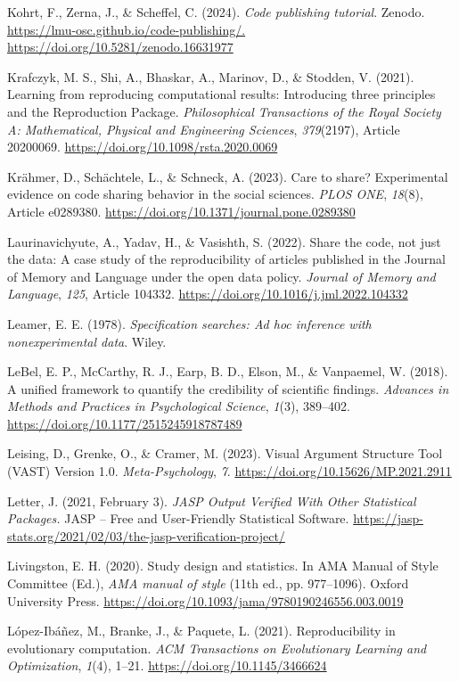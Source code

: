 \documentclass[authordate, meta]{jote-new-article}
\begin{document}
	Kohrt, F., Zerna, J., \& Scheffel, C. (2024). \emph{Code publishing tutorial}. Zenodo. \url{https://lmu-osc.github.io/code-publishing/.} \url{https://doi.org/10.5281/zenodo.16631977}


	Krafczyk, M. S., Shi, A., Bhaskar, A., Marinov, D., \& Stodden, V. (2021). Learning from reproducing computational results: Introducing three principles and the Reproduction Package. \emph{Philosophical Transactions of the Royal Society A: Mathematical, Physical and Engineering Sciences}, \emph{379}(2197), Article 20200069. \url{https://doi.org/10.1098/rsta.2020.0069}


	Krähmer, D., Schächtele, L., \& Schneck, A. (2023). Care to share? Experimental evidence on code sharing behavior in the social sciences. \emph{PLOS ONE}, \emph{18}(8), Article e0289380. \url{https://doi.org/10.1371/journal.pone.0289380}


	Laurinavichyute, A., Yadav, H., \& Vasishth, S. (2022). Share the code, not just the data: A case study of the reproducibility of articles published in the Journal of Memory and Language under the open data policy. \emph{Journal of Memory and Language}, \emph{125}, Article 104332. \url{https://doi.org/10.1016/j.jml.2022.104332}


	Leamer, E. E. (1978). \emph{Specification searches: Ad hoc inference with nonexperimental data}. Wiley.


	LeBel, E. P., McCarthy, R. J., Earp, B. D., Elson, M., \& Vanpaemel, W. (2018). A unified framework to quantify the credibility of scientific findings. \emph{Advances in Methods and Practices in Psychological Science}, \emph{1}(3), 389--402. \url{https://doi.org/10.1177/2515245918787489}


	Leising, D., Grenke, O., \& Cramer, M. (2023). Visual Argument Structure Tool (VAST) Version 1.0. \emph{Meta-Psychology}, \emph{7}. \url{https://doi.org/10.15626/MP.2021.2911}


	Letter, J. (2021, February 3). \emph{JASP Output Verified With Other Statistical Packages.} JASP -- Free and User-Friendly Statistical Software. \url{https://jasp-stats.org/2021/02/03/the-jasp-verification-project/}


	Livingston, E. H. (2020). Study design and statistics. In AMA Manual of Style Committee (Ed.), \emph{AMA manual of style} (11th ed., pp. 977--1096). Oxford University Press. \url{https://doi.org/10.1093/jama/9780190246556.003.0019}


	López-Ibáñez, M., Branke, J., \& Paquete, L. (2021). Reproducibility in evolutionary computation. \emph{ACM Transactions on Evolutionary Learning and Optimization}, \emph{1}(4), 1--21. \url{https://doi.org/10.1145/3466624}
\end{document}
